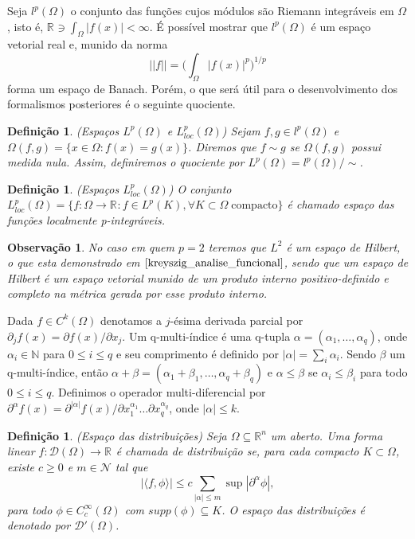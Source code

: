 \documentclass[12pt]{book}
\newtheorem{definicao}[teorema]{Definição}
\newtheorem{observacao}[teorema]{Observação}
\newcommand{\derivadaparcialabrev}[1]{\partial_{#1}}
\newcommand{\distribuicoes}{\distribuicoesgeral{\Omega}}
\newcommand{\distribuicoesgeral}[1]{\mathcal{D'}(#1)}
\newcommand{\espacoLp}[1]{L^{p}(#1)}
\newcommand{\espacoLpcomp}[1]{L^{p}_{loc}(#1)}
\newcommand{\espacoLpGeral}[2]{L^{#1}(#2)}
\newcommand{\funcoesdiferenciaveis}[2]{C^{#1}(#2)}
\newcommand{\funcoesdiferenciaveissupp}[2]{C^{#1}_{c}(#2)}
\newcommand{\funcoesteste}{\mathcal{D}(\Omega)}
\newcommand{\norma}[1]{||#1||}
\newcommand{\normaLpdefinicao}[2]{ \Big(\int_{#2}#1^{p}\Big)^{1/p}}
\newcommand{\produtointerno}[2]{\langle #1, #2 \rangle}
\newcommand{\real}[1]{\mathbb{R}^{#1}}
\newcommand{\reta}{\real{}}
\begin{document}
	Seja $l^{p}(\Omega)$ o conjunto das funções cujos módulos são Riemann integráveis em $\Omega$, isto é, $\reta\ni \int_{\Omega}|f(x)| < \infty$. É possível mostrar que $l^{p}(\Omega)$ é um espaço vetorial real e, munido da norma
	$$
	\norma{f}=\normaLpdefinicao{|f(x)|}{\Omega}
	$$
	forma um espaço de Banach. Porém, o que será útil para o desenvolvimento dos formalismos posteriores é o seguinte quociente.
	
	\begin{definicao}\label{definicao_espaco_Lp}
		(Espaços $\espacoLpGeral{p}{\Omega}$ e $\espacoLpcomp{\Omega}$) Sejam $f,g \in l^{p}(\Omega)$ e $\Omega(f,g) = \{x\in \Omega: f(x) = g(x)\}$. Diremos que $f \sim g$ se $\Omega(f,g)$ possui medida nula. Assim, definiremos o quociente por $\espacoLpGeral{p}{\Omega} = l^{p}(\Omega)/\sim$.
	\end{definicao}
	
	\begin{definicao}
		(Espaços $\espacoLpcomp{\Omega}$) O conjunto $\espacoLpcomp{\Omega} = \{f:\Omega\to \reta: f \in \espacoLp{K}, \forall K \subset \Omega \;\text{compacto}\}$ é chamado espaço das funções localmente p-integráveis.
	\end{definicao}
	
	\begin{observacao}
		No caso em quem $p=2$ teremos que $L^{2}$ é um espaço de Hilbert, o que esta demonstrado em $\cite{kreyszig_analise_funcional}$, sendo que um espaço de Hilbert é um espaço vetorial munido de um produto interno positivo-definido e completo na métrica gerada por esse produto interno.
	\end{observacao}
	
	Dada $f \in \funcoesdiferenciaveis{k}{\Omega}$ denotamos a $j$-ésima derivada parcial por $\derivadaparcialabrev{j}f(x) = \partial f(x)/\partial x_{j}$. Um q-multi-índice é uma q-tupla $\alpha = (\alpha_{1}, \dots, \alpha_{q})$, onde $\alpha_{i} \in \mathbb{N}$ para $0\leq i \leq q$ e seu comprimento é definido por $|\alpha| = \sum_{i}\alpha_{i}$. Sendo $\beta$ um q-multi-índice, então $\alpha+\beta=(\alpha_{1}+\beta_{1}, \dots, \alpha_{q}+\beta_{q})$ e $\alpha\leq \beta$ se $\alpha_{i}\leq\beta_{i}$ para todo $0\leq i \leq q$. Definimos o operador multi-diferencial por $\partial^{\alpha} f(x) = \partial^{|\alpha|}f(x)/\partial{x^{\alpha_{1}}_{1}} \dots \partial{x^{\alpha_{q}}_{q}}$, onde $|\alpha|\leq k$.
	
	\begin{definicao}
		(Espaço das distribuições) Seja $\Omega \subseteq \real{n}$ um aberto. Uma forma linear $f:\funcoesteste \to \reta$ é chamada de distribuição se, para cada compacto $K\subset \Omega$, existe $c\geq 0$ e $m \in \mathcal{N}$ tal que 
		$$
		|\produtointerno{f}{\phi}| \leq c \sum_{|\alpha|\leq m} \sup|\partial^{\alpha}\phi|,
		$$
		para todo $\phi \in \funcoesdiferenciaveissupp{\infty}{\Omega}$ com $supp (\phi) \subseteq K$. O espaço das distribuições é denotado por $\distribuicoes$.
	\end{definicao}
	
\end{document}
